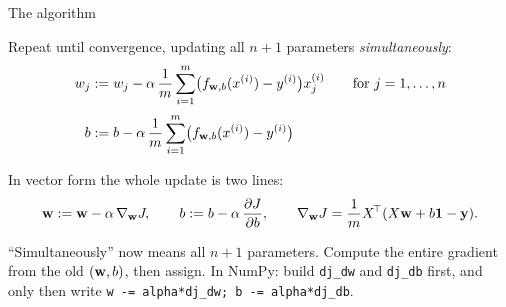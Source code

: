 \documentclass[aspectratio=169,10pt]{beamer}
\begin{document}
\begin{frame}{The algorithm}
  \begin{defnbox}
    Repeat until convergence, updating all $n+1$ parameters \emph{simultaneously}:
    \[
      \begin{aligned}
        w_j &:= w_j - \alpha\,\frac{1}{m}\sum_{i=1}^{m}\bigl(f_{\mathbf{w},b}(x^{(i)})-y^{(i)}\bigr)x^{(i)}_{j}
        \qquad \text{for } j = 1,\dots,n\\[2pt]
        b &:= b - \alpha\,\frac{1}{m}\sum_{i=1}^{m}\bigl(f_{\mathbf{w},b}(x^{(i)})-y^{(i)}\bigr)
      \end{aligned}
    \]
  \end{defnbox}
  \footnotesize
  In vector form the whole update is two lines:
  \[
    \mathbf{w} := \mathbf{w} - \alpha\,\nabla_{\mathbf{w}}J, \qquad b := b - \alpha\,\frac{\partial J}{\partial b},
    \qquad
    \nabla_{\mathbf{w}}J = \frac{1}{m}X^{\!\top}(X\mathbf{w} + b\mathbf{1} - \mathbf{y}) .
  \]
  \begin{pitfall}
    ``Simultaneously'' now means all $n+1$ parameters. Compute the entire gradient from the
    old $(\mathbf{w},b)$, then assign. In NumPy: build \texttt{dj\_dw} and \texttt{dj\_db} first,
    and only then write \texttt{w -= alpha*dj\_dw; b -= alpha*dj\_db}.
  \end{pitfall}
\end{frame}
\end{document}

